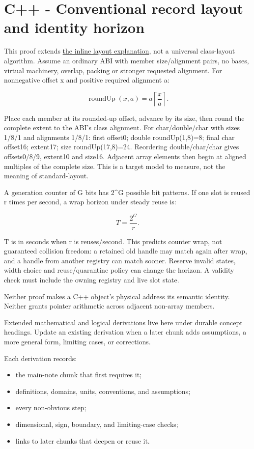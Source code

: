 \section{C++ - Conventional record layout and identity horizon}\label{01-foundations-i-ch011-c---conventional-record-layout-and-identity-horizon}

This proof extends \hyperref[01-foundations-i-ch003-bringing-the-object-model-back-to-bytes]{the inline layout explanation}, not a universal class-layout algorithm. Assume an ordinary ABI with member size/alignment pairs, no bases, virtual machinery, overlap, packing or stronger requested alignment. For nonnegative offset x and positive required alignment a:

\[
\operatorname{roundUp}(x,a)=a\left\lceil\frac{x}{a}\right\rceil.
\]

Place each member at its rounded-up offset, advance by its size, then round the complete extent to the ABI's class alignment. For char/double/char with sizes 1/8/1 and alignments 1/8/1: first offset0; double roundUp(1,8)=8; final char offset16; extent17; size roundUp(17,8)=24. Reordering double/char/char gives offsets0/8/9, extent10 and size16. Adjacent array elements then begin at aligned multiples of the complete size. This is a target model to measure, not the meaning of standard-layout.

A generation counter of G bits has 2\^{}G possible bit patterns. If one slot is reused r times per second, a wrap horizon under steady reuse is:

\[
T=\frac{2^G}{r}.
\]

T is in seconds when r is reuses/second. This predicts counter wrap, not guaranteed collision freedom: a retained old handle may match again after wrap, and a handle from another registry can match sooner. Reserve invalid states, width choice and reuse/quarantine policy can change the horizon. A validity check must include the owning registry and live slot state.

Neither proof makes a C++ object's physical address its semantic identity. Neither grants pointer arithmetic across adjacent non-array members.

Extended mathematical and logical derivations live here under durable concept headings. Update an existing derivation when a later chunk adds assumptions, a more general form, limiting cases, or corrections.

Each derivation records:

\begin{itemize}
\tightlist
\item
  the main-note chunk that first requires it;
\item
  definitions, domains, units, conventions, and assumptions;
\item
  every non-obvious step;
\item
  dimensional, sign, boundary, and limiting-case checks;
\item
  links to later chunks that deepen or reuse it.
\end{itemize}

